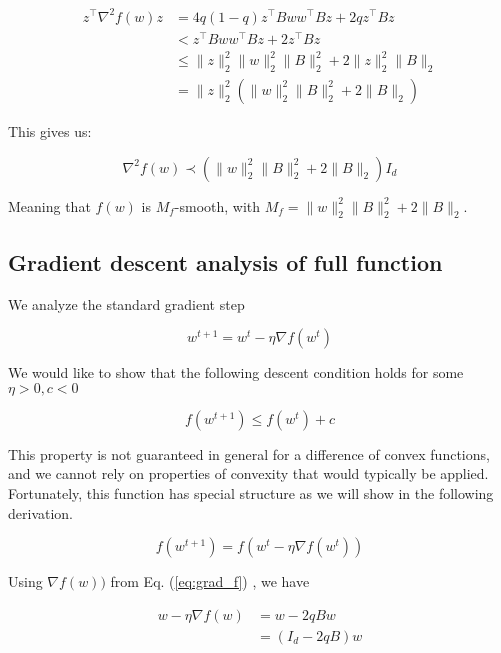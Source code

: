 \documentclass[11pt]{article}
\begin{document}
\begin{align*}
z^{\top} \nabla^2 f(w) z 
&= 4q(1-q) z^{\top} Bww^{\top}B z + 2q z^{\top} B z \\
&< z^{\top} Bww^{\top}B z + 2 z^{\top} B z \\
&\leq \|z\|_2^2 \|w\|_2^2 \|B\|_2^2 + 2 \|z\|_2^2 \|B\|_2 \\
&= \|z\|_2^2 ( \|w\|_2^2 \|B\|_2^2 + 2 \|B\|_2 ) 
\end{align*}

This gives us:

\begin{equation}
    \nabla^2 f(w) \prec ( \|w\|_2^2 \|B\|_2^2 + 2 \|B\|_2 ) I_d
\end{equation}

Meaning that $f(w)$ is $M_f$-smooth, with $M_f = \|w\|_2^2 \|B\|_2^2 + 2 \|B\|_2$.

\subsection{Gradient descent analysis of full function}

We analyze the standard gradient step

\begin{equation}
    w^{t+1} = w^t - \eta \nabla f(w^t)
\end{equation}

We would like to show that the following descent condition holds for some $\eta > 0, c < 0$

\begin{equation}
\label{eq:descent_condition}
    f(w^{t+1}) \leq f(w^t) + c
\end{equation}

This property is not guaranteed in general for a difference of convex functions, and we cannot rely on properties of convexity that would typically be applied. Fortunately, this function has special structure as we will show in the following derivation.

\begin{equation}
    f(w^{t+1}) = f(w^t - \eta \nabla f(w^t)) 
\end{equation}

Using $\nabla f(w))$ from Eq. (\ref{eq:grad_f}) , we have

\begin{align*}
    w - \eta \nabla f(w) &= w - 2qBw \\
    &= (I_d - 2qB)w
\end{align*}
\end{document}
